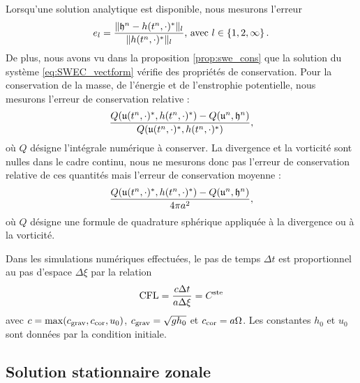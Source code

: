 Lorsqu'une solution analytique est disponible, nous mesurons l'erreur
\begin{equation}
e_l = \dfrac{\| \mathfrak{h}^n - h(t^n,\cdot)^* \|_l}{\| h(t^n,\cdot)^* \|_l} \text{, avec } l \in \left\lbrace 1, 2, \infty \right\rbrace.
\end{equation}
De plus, nous avons vu dans la proposition \ref{prop:swe_cons} que la solution du système \eqref{eq:SWEC_vectform} vérifie des propriétés de conservation. Pour la conservation de la masse, de l'énergie et de l'enstrophie potentielle, nous mesurons l'erreur de conservation relative :
\begin{equation}
\dfrac{Q(\mathfrak{u}(t^n,\cdot)^*, h(t^n,\cdot)^*) - Q(\mathfrak{u}^n, \mathfrak{h}^n)}{Q(\mathfrak{u}(t^n,\cdot)^*, h(t^n,\cdot)^*)},
\end{equation}
où $Q$ désigne l'intégrale numérique à conserver.
La divergence et la vorticité sont nulles dans le cadre continu, nous ne mesurons donc pas l'erreur de conservation relative de ces quantités mais l'erreur de conservation moyenne :
\begin{equation}
\dfrac{Q(\mathfrak{u}(t^n,\cdot)^*, h(t^n,\cdot)^*) - Q(\mathfrak{u}^n, \mathfrak{h}^n)}{4 \pi a^2},
\end{equation}
où $Q$ désigne une formule de quadrature sphérique appliquée à la divergence ou à la vorticité.

Dans les simulations numériques effectuées, le pas de temps $\Delta t$ est proportionnel au pas d'espace $\Delta \xi$ par la relation
\begin{equation}
\text{CFL} = \dfrac{c \Delta t}{a \Delta \xi} = C^{\text{ste}}
\end{equation}
avec $c = \max (c_{\text{grav}}, c_{\text{cor}}, u_0)$, $c_{\text{grav}} = \sqrt{gh_0}$ et $c_{\text{cor}} = a \Omega$. Les constantes $h_0$ et $u_0$ sont données par la condition initiale.






















\subsection{Solution stationnaire zonale}

